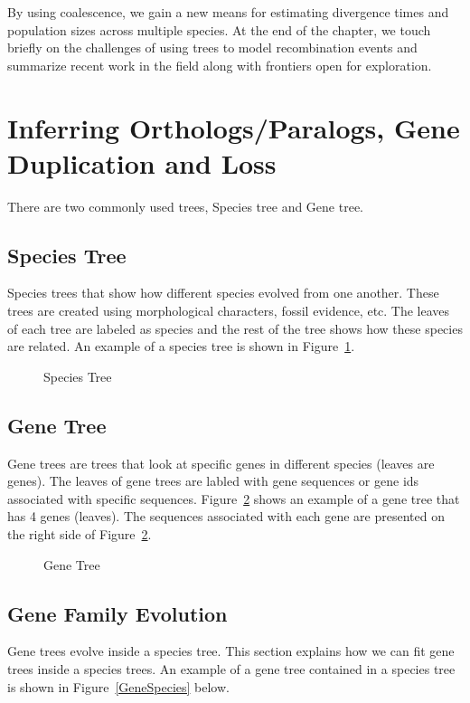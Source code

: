 By using coalescence, we gain a new means for estimating divergence times and population sizes across multiple species. At the end of the chapter, we touch briefly on the challenges of using trees to model recombination events and summarize recent work in the field along with frontiers open for exploration.

\section{Inferring Orthologs/Paralogs, Gene Duplication and Loss}

\noindent There are two commonly used trees, Species tree and Gene tree. 

\subsection {Species Tree}
Species trees that show how different species evolved from one another. These trees are created using morphological characters, fossil evidence, etc. The leaves of each tree are labeled as species and the rest of the tree shows how these species are related.  An example of a species tree is shown in Figure~\ref{SpeciesTree}.

\begin{figure}[ht!]
  \centering
  \caption{Species Tree}
  \label{SpeciesTree}
\end{figure}

\subsection {Gene Tree}
Gene trees are trees that look at specific genes in different species (leaves are genes). The leaves of gene trees are labled with gene sequences or gene ids associated with specific sequences. Figure~\ref{GeneTree} shows an example of a gene tree that has 4 genes (leaves). The sequences associated with each gene are presented on the right side of Figure~\ref{GeneTree}.
\begin{figure}[ht!]
  \centering
  \caption{Gene Tree}
  \label{GeneTree}
\end{figure}

\subsection{Gene Family Evolution}
Gene trees evolve inside a species tree. This section explains how we can fit gene trees inside a species trees. An example of a gene tree contained in a species tree is shown in Figure~\ref{GeneSpecies} below.

